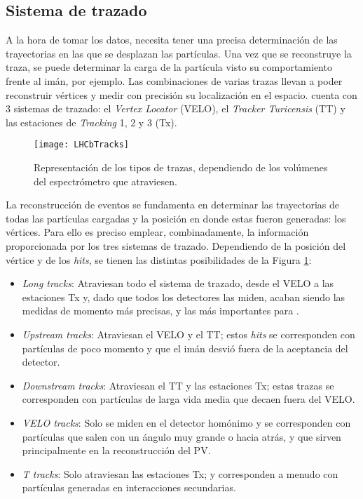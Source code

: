 

\subsection{Sistema de trazado} %

A la hora de tomar los datos, \lhcb \cite{Alves:1129809} necesita tener una precisa determinación de las trayectorias en las que se desplazan las partículas.  Una vez que se reconstruye la traza, se puede determinar la carga de la partícula visto su comportamiento frente al imán, por ejemplo. Las combinaciones de varias trazas llevan a poder reconstruir vértices y medir con precisión su localización en el espacio. \lhcb cuenta con 3 sistemas de trazado: \color{vero} el \emph{Vertex Locator} (VELO), el \emph{Tracker Turicensis} (TT) y las estaciones de \emph{Tracking} 1, 2 y 3 (Tx). \color{norm}

\begin{figure}[H]
\texttt{[image: LHCbTracks]}
\caption{Representación de los tipos de trazas, dependiendo de los volúmenes del espectrómetro que atraviesen.}	 \label{fig_tracks}
\end{figure}

\vspace*{-1cm}

La reconstrucción de eventos se fundamenta en determinar las trayectorias de todas las partículas cargadas y la posición en donde estas fueron generadas: los vértices. Para ello es preciso emplear, combinadamente, la información proporcionada por los tres sistemas de trazado. Dependiendo de la posición del vértice y de los \emph{hits},  se tienen las distintas posibilidades \color{vero} de la Figura \ref{fig_tracks}:\color{norm}
\begin{itemize}
	\item \textit{Long tracks}: Atraviesan todo el sistema de trazado, desde el VELO a las estaciones Tx y, dado que todos los detectores las miden, acaban siendo las medidas de momento más precisas, y las más importantes para \lhcb.
	\item \textit{Upstream tracks}: Atraviesan el VELO  y el TT; estos \emph{hits} se corresponden con partículas de poco momento y que el imán desvió fuera de la aceptancia del detector.
	\item \textit{Downstream tracks}: Atraviesan el TT y las estaciones Tx; estas trazas se corresponden con partículas de larga vida media que decaen fuera del VELO.
	\item \textit{VELO tracks}: Solo se miden en el detector homónimo y se corresponden con partículas que salen con un ángulo muy grande o hacia atrás, y que sirven principalmente en la reconstrucción del PV.
	\item \textit{T tracks}: Solo atraviesan las estaciones Tx; y corresponden a menudo con partículas generadas en interacciones secundarias.
\end{itemize}
%




